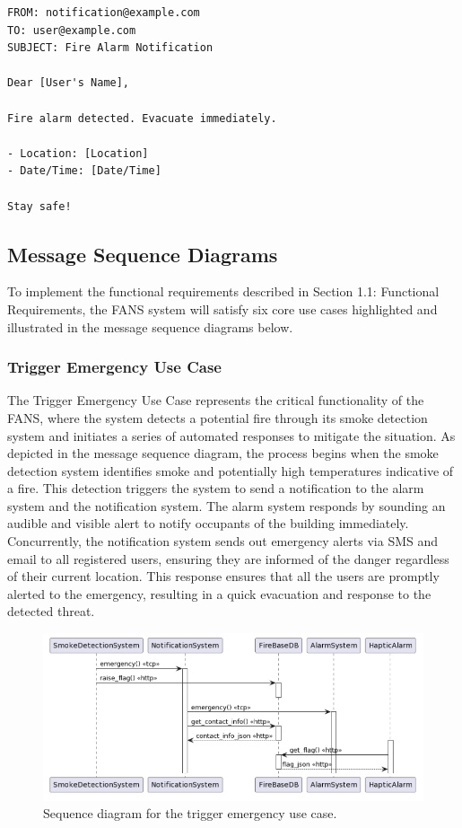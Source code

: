 \begin{lstlisting}[label={lst:email},caption={Email notification for detected emergency in FANS.}]
FROM: notification@example.com
TO: user@example.com
SUBJECT: Fire Alarm Notification

Dear [User's Name],

Fire alarm detected. Evacuate immediately.

- Location: [Location]
- Date/Time: [Date/Time]

Stay safe!
\end{lstlisting}

\subsection{Message Sequence Diagrams}

To implement the functional requirements described in Section 1.1: Functional Requirements, the FANS system will
satisfy six core use cases highlighted and illustrated in the message sequence diagrams below.

\subsubsection{Trigger Emergency Use Case}

The Trigger Emergency Use Case represents the critical functionality of the FANS, where the system detects a potential
fire through its smoke detection system and initiates a series of automated responses to mitigate the situation. As
depicted in the message sequence diagram, the process begins when the smoke detection system identifies smoke and
potentially high temperatures indicative of a fire. This detection triggers the system to send a notification to the
alarm system and the notification system. The alarm system responds by sounding an audible and visible alert to notify
occupants of the building immediately. Concurrently, the notification system sends out emergency alerts via SMS and
email to all registered users, ensuring they are informed of the danger regardless of their current location. This
response ensures that all the users are promptly alerted to the emergency, resulting in a quick evacuation and response
to the detected threat.

\begin{figure}[H]
    \centering
    \includegraphics[width=\linewidth]{../assets/TriggerEmergencyUseCase.png}
    \caption{Sequence diagram for the trigger emergency use case.}
\end{figure}

